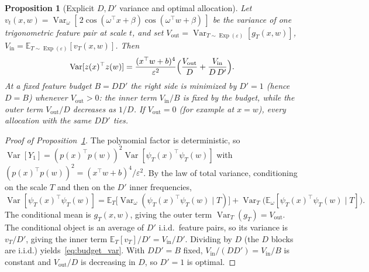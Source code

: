 \documentclass{article}
\newtheorem{proposition}[theorem]{Proposition}
\DeclareMathOperator{\Var}{Var}
\DeclareMathOperator{\Exp}{Exp}
\begin{document}
\begin{proposition}[Explicit $D,D'$ variance and optimal allocation]\label{prop:budget}
Let $v_t(x,w)=\Var_\omega[\,2\cos(\omega^\top x+\beta)\cos(\omega^\top w+\beta)\,]$ be the variance of one trigonometric feature pair at scale $t$, and set $V_{\mathrm{out}}=\Var_{T\sim\Exp(\varepsilon)}[g_T(x,w)]$, $V_{\mathrm{in}}=\mathbb{E}_{T\sim\Exp(\varepsilon)}[v_T(x,w)]$. Then
\begin{equation}\label{eq:budget_var}
\Var[z(x)^\top z(w)]=\frac{(x^\top w+b)^4}{\varepsilon^2}\Bigl(\frac{V_{\mathrm{out}}}{D}+\frac{V_{\mathrm{in}}}{D\,D'}\Bigr).
\end{equation}
At a fixed feature budget $B=DD'$ the right side is minimized by $D'=1$ (hence $D=B$) whenever $V_{\mathrm{out}}>0$: the inner term $V_{\mathrm{in}}/B$ is fixed by the budget, while the outer term $V_{\mathrm{out}}/D$ decreases as $1/D$. If $V_{\mathrm{out}}=0$ (for example at $x=w$), every allocation with the same $DD'$ ties.
\end{proposition}
\begin{proof}[Proof of Proposition~\ref{prop:budget}]
The polynomial factor is deterministic, so $\Var[Y_1]=(p(x)^\top p(w))^2\Var[\psi_T(x)^\top\psi_T(w)]$ with $(p(x)^\top p(w))^2=(x^\top w+b)^4/\varepsilon^2$. By the law of total variance, conditioning on the scale $T$ and then on the $D'$ inner frequencies,
\[
\Var[\psi_T(x)^\top\psi_T(w)]=\mathbb{E}_T\bigl[\Var_\omega(\psi_T(x)^\top\psi_T(w)\mid T)\bigr]+\Var_T\bigl(\mathbb{E}_\omega[\psi_T(x)^\top\psi_T(w)\mid T]\bigr).
\]
The conditional mean is $g_T(x,w)$, giving the outer term $\Var_T(g_T)=V_{\mathrm{out}}$. The conditional object is an average of $D'$ i.i.d.\ feature pairs, so its variance is $v_T/D'$, giving the inner term $\mathbb{E}_T[v_T]/D'=V_{\mathrm{in}}/D'$. Dividing by $D$ (the $D$ blocks are i.i.d.) yields~\eqref{eq:budget_var}. With $DD'=B$ fixed, $V_{\mathrm{in}}/(DD')=V_{\mathrm{in}}/B$ is constant and $V_{\mathrm{out}}/D$ is decreasing in $D$, so $D'=1$ is optimal.
\end{proof}
\end{document}
